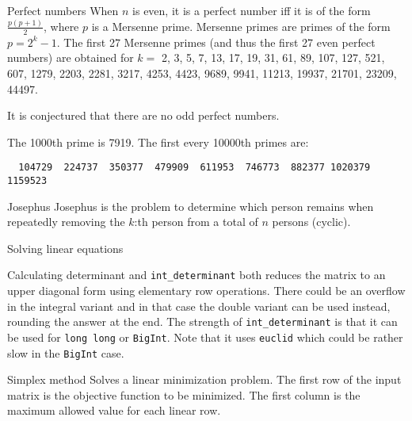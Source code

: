 \categorycontents{}


\begin{algorithm}{Perfect numbers}
\desc
When $n$ is even, it is a perfect number iff it is of the form
$\frac{p (p+1)}{2}$, where $p$ is a Mersenne prime. Mersenne primes are primes
of the form $p = 2^k - 1$. The first 27 Mersenne primes (and thus the first 27
even perfect numbers) are obtained for $k =$ 2, 3, 5, 7, 13, 17, 19, 31, 61,
89, 107, 127, 521, 607, 1279, 2203, 2281, 3217, 4253, 4423, 9689, 9941, 11213,
19937, 21701, 23209, 44497.

It is conjectured that there are no odd perfect numbers.
\end{algorithm}


The 1000th prime is 7919. The first every 10000th primes are:
{\small
\begin{verbatim}
  104729  224737  350377  479909  611953  746773  882377 1020379 1159523
\end{verbatim}
}

\begin{algorithm}{Josephus}
\desc
Josephus is the problem to determine which person remains when repeatedly
removing the $k$:th person from a total of $n$ persons (cyclic).
\end{algorithm}

\begin{algorithm}{Solving linear equations}
\end{algorithm}

\begin{algorithm}{Calculating determinant}
 and {\tt int\_determinant} both reduces the matrix
to an upper diagonal form using elementary row operations. There could be an
overflow in the integral variant and in that case the double variant
can be used instead, rounding the answer at the end. The strength of
{\tt int\_determinant} is that it can be used for {\tt long long} or
{\tt BigInt}. Note that it uses {\tt euclid} which could be rather
slow in the {\tt BigInt} case.
\end{algorithm}

\begin{algorithm}{Simplex method}
\desc
Solves a linear minimization problem. The first row of the
input matrix is the objective function to be minimized. The
first column is the maximum allowed value for each linear row.
\end{algorithm}

